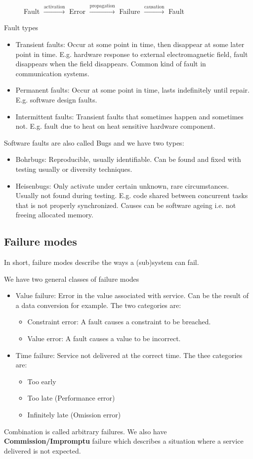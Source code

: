 \begin{figure}[H]
\centering
    Fault $\xrightarrow{\text{activation}}$ Error $\xrightarrow{\text{propagation}}$ Failure $\xrightarrow{\text{causation}}$ Fault
\end{figure}
Fault types
\begin{itemize}
\item Transient faults: Occur at some point in time, then disappear at some later point in time. E.g. hardware response to external electromagnetic field, fault disappears when the field disappears. Common kind of fault in communication systems.
\item Permanent faults: Occur at some point in time, lasts indefinitely until repair. E.g. software design faults.
\item Intermittent faults: Transient faults that sometimes happen and sometimes not. E.g. fault due to heat on heat sensitive hardware component.
\end{itemize}

Software faults are also called Bugs and we have two types:
\begin{itemize}
\item Bohrbugs: Reproducible, usually identifiable. Can be found and fixed with testing usually or diversity techniques.
\item Heisenbugs: Only activate under certain unknown, rare circumstances. Usually not found during testing. E.g. code shared between concurrent tasks that is not properly synchronized. Causes can be software ageing i.e. not freeing allocated memory. 
\end{itemize}

\subsection{Failure modes}
In short, failure modes describe the ways a (sub)system can fail.

We have two general classes of failure modes
\begin{itemize}
\item Value failure: Error in the value associated with service. Can be the result of a data conversion for example. The two categories are:
\begin{itemize}
    \item Constraint error: A fault causes a constraint to be breached.
    \item Value error: A fault causes a value to be incorrect.
\end{itemize}
\item Time failure: Service not delivered at the correct time. The thee categories are:
\begin{itemize}
    \item Too early
    \item Too late (Performance error)
    \item Infinitely late (Omission error)
\end{itemize}
\end{itemize}
Combination is called arbitrary failures. We also have \textbf{Commission/Impromptu} failure which describes a situation where a service delivered is not expected.

